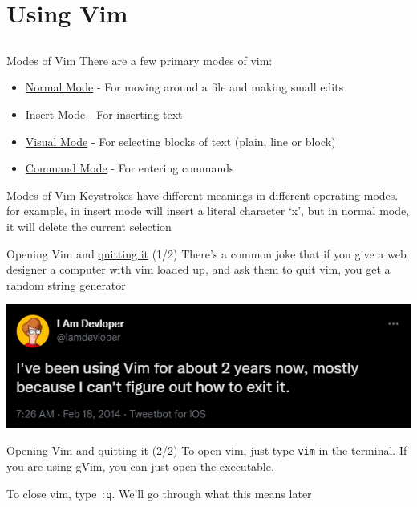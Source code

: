 \documentclass[12pt]{beamer}
\begin{document}
\section{Using Vim}
\subsection{}

\begin{frame}{Modes of Vim}
    There are a few primary modes of vim:
    \begin{itemize}
        \item \underline{Normal Mode} - For moving around a file and making small edits
        \item \underline{Insert Mode} - For inserting text
        \item \underline{Visual Mode} - For selecting blocks of text (plain, line or block)
        \item \underline{Command Mode} - For entering commands
    \end{itemize}{}
\end{frame}{}

\begin{frame}{Modes of Vim}
    Keystrokes have different meanings in different operating modes. for example,  in insert mode will insert a literal character ‘x’, but in normal mode, it will delete the current selection
\end{frame}{}

\begin{frame}{Opening Vim and \underline{quitting it} (1/2)}
    There's a common joke that if you give a web designer a computer with vim loaded up, and ask them to quit vim, 
    you get a random string generator
    
    \includegraphics[width=1\linewidth]{2022hs5/exit_vim.png}
\end{frame}

\begin{frame}{Opening Vim and \underline{quitting it} (2/2)}
    To open vim, just type \texttt{vim} in the terminal. If you are using gVim, you can just open the executable.
    
    To close vim, type \texttt{:q}. We'll go through what this means later
\end{frame}{}
\end{document}
